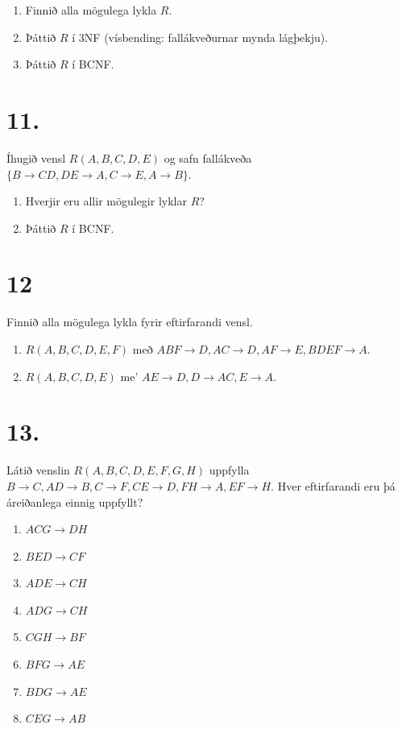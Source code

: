 \documentclass{article}
\newcommand{\enum}{\begin{enumerate}[label = \alph*.]}
\begin{document}
\enum
\item  Finnið alla mögulega lykla $R$.
\item  Þáttið $R$ í 3NF (vísbending: fallákveðurnar mynda lágþekju).
\item  Þáttið $R$ í BCNF. 
\end{enumerate}

\vspace{1cm}

\section{11.}
Íhugið vensl $R(A, B, C, D, E)$ og safn fallákveða
$\{B \rightarrow CD, DE \rightarrow A, C \rightarrow E, A \rightarrow B\}$.

\enum
\item Hverjir eru allir mögulegir lyklar $R$?
\item Þáttið $R$ í BCNF.
\end{enumerate}


\vspace{1cm}


\section{12}
Finnið alla mögulega lykla fyrir eftirfarandi vensl.
\enum
\item $R(A,B,C,D,E,F)$ með $ABF \rightarrow D, AC \rightarrow D, AF \rightarrow E, BDEF \rightarrow A$.
\item $R(A,B,C,D,E)$ me' $AE \rightarrow D, D \rightarrow AC, E \rightarrow A$.
\end{enumerate}

\newpage


\section{13.}
Látið venslin $R(A, B, C, D, E, F, G, H)$ uppfylla $B \rightarrow C, AD \rightarrow B, C \rightarrow
F, CE \rightarrow D, FH \rightarrow A, EF \rightarrow H$.
Hver eftirfarandi eru þá áreiðanlega einnig uppfyllt?

\enum
\item $ACG \rightarrow DH$
\item $BED \rightarrow CF$
\item $ADE \rightarrow CH$
\item $ADG \rightarrow CH$
\item $CGH \rightarrow BF$
\item $BFG \rightarrow AE$
\item $BDG \rightarrow AE$
\item $CEG \rightarrow AB$
\end{enumerate}
\end{document}

